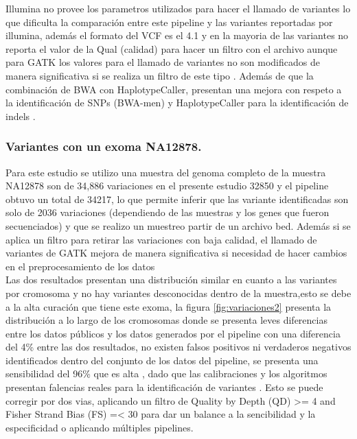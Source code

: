 Illumina no provee los parametros utilizados para hacer el llamado de variantes lo que dificulta la comparación entre este pipeline y las variantes reportadas por illumina, además el formato del VCF es el 4.1 y en la mayoria de las variantes no reporta el valor de la Qual (calidad) para hacer un filtro con el archivo aunque para GATK los valores para el llamado de variantes no son modificados de manera significativa si se realiza un filtro de este tipo \cite{Hwang2015}. Además de que la combinación de BWA con HaplotypeCaller, presentan una mejora con respeto a la identificación de SNPs (BWA-men) y HaplotypeCaller para la identificación de indels \cite{Cornish2015}.

\subsubsection*{Variantes con un exoma NA12878.}

Para este estudio se utilizo una muestra del genoma completo de la muestra NA12878 son de 34,886 variaciones \cite{Cornish2015} en el presente estudio 32850 y el pipeline obtuvo un total de 34217, lo que permite inferir que las variante identificadas son solo de 2036 variaciones (dependiendo de las muestras y los genes que fueron secuenciados) y que se realizo un muestreo partir de un archivo bed. Además si se aplica un filtro para retirar las variaciones con baja calidad, el llamado de variantes de GATK mejora de manera significativa si necesidad de hacer cambios en el preprocesamiento de los datos \cite{Warden2014} \\

Las dos resultados presentan una distribución similar en cuanto a las variantes por cromosoma y no hay variantes desconocidas dentro de la muestra,esto se debe a la alta curación que tiene este exoma, la figura \ref{fig:variaciones2} presenta la distribución a lo largo de los cromosomas donde se presenta leves diferencias entre los datos públicos y los datos generados por el pipeline con una diferencia del 4\% entre las dos resultados, no existen falsos positivos ni verdaderos negativos identificados dentro del conjunto de los datos del pipeline, se presenta una sensibilidad del 96\% que es alta , dado que las calibraciones y los algoritmos presentan falencias reales para la identificación de variantes \cite{Auwera2014}. Esto se puede corregir por dos vias, aplicando un filtro de Quality by Depth (QD) >= 4 and Fisher Strand Bias (FS) =< 30 para dar un balance  a la sencibilidad y la especificidad \cite{Tsai2016} o aplicando múltiples pipelines.\\

